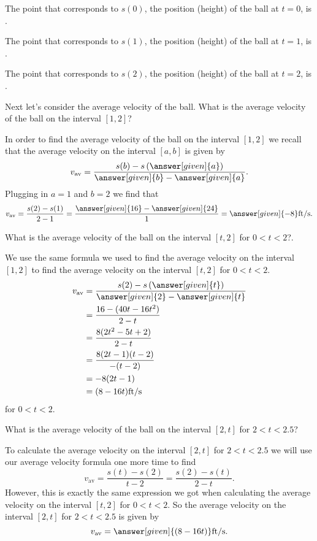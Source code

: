 \documentclass{ximera}
\begin{document}
\begin{example}
The point that corresponds to $s(0)$, the position (height) of the 
ball at $t=0$, is .

The point that corresponds to $s(1)$, the position (height) of the 
ball at $t=1$, is .

The point that corresponds to $s(2)$, the position (height) of the 
ball at $t=2$, is .

Next let's consider the average velocity of the ball. What is the average velocity of the ball on the interval $[1,2]$?

\begin{explanation}

In order to find the average velocity of the ball on the 
interval $[1,2]$ we recall that the average velocity on 
the interval $[a,b]$ is given by
\[
v_{\text{av}} = 
\frac{s(b) - s\left(\answer[given]{a}\right)}
{\answer[given]{b} - \answer[given]{a}}.
\]
Plugging in $a=1$ and $b=2$ we find that 
\[
v_{\text{av}} = \frac{s(2)-s(1)}{2-1} = 
\frac{\answer[given]{16} - \answer[given]{24}}{1} =
\answer[given]{-8}\text{ft/s.}
\] 

\end{explanation}

What is the average velocity of the ball on the interval
$[t,2]$ for $0<t<2$?.  

\begin{explanation}

We use the same formula we used to find the average velocity on
the interval $[1,2]$ to find the average velocity on the interval
$[t,2]$ for $0<t<2$.
\begin{align*}
v_{\text{av}} &= 
\frac{s(2)-s\left(\answer[given]{t}\right)}
{\answer[given]{2}-\answer[given]{t}}\\
&= \frac{16 - (40t-16t^2)}{2-t}\\
&= \frac{8(2t^2-5t+2)}{2-t}\\
&= \frac{8(2t-1)(t-2)}{-(t-2)}\\
&= -8(2t-1)\\
&= (8-16t)\text{ft/s}
\end{align*}
for $0<t<2$.

\end{explanation}

What is the average velocity of the ball on the interval $[2,t]$ for
$2<t<2.5$?

\begin{explanation}

To calculate the average velocity on the interval $[2,t]$ for 
$2<t<2.5$ we will use our average velocity formula one more time
to find
\[
v_{\text{av}} = \frac{s(t)-s(2)}{t-2} = \frac{s(2)-s(t)}{2-t}. 
\]
However, this is exactly the same expression we got when calculating
the average velocity on the interval $[t,2]$ for $0<t<2$.  So the 
average velocity on the interval $[2,t]$ for $2<t<2.5$ is given by
\[
v_{\text{av}} = \answer[given]{(8-16t)}\text{ft/s.}
\]
\end{explanation}
\end{example}
\end{document}
